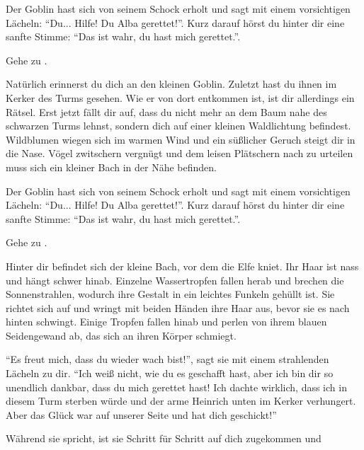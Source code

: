 Der Goblin hast sich von seinem Schock erholt und sagt mit einem vorsichtigen Lächeln: ``Du... Hilfe! Du Alba gerettet!''. Kurz darauf hörst du hinter dir eine sanfte Stimme: ``Das ist wahr, du hast mich gerettet.''.

Gehe zu .


Natürlich erinnerst du dich an den kleinen Goblin.
Zuletzt hast du ihnen im Kerker des Turms gesehen.
Wie er von dort entkommen ist, ist dir allerdings ein Rätsel.
Erst jetzt fällt dir auf, dass du nicht mehr an dem Baum nahe des schwarzen Turms lehnst, sondern dich auf einer kleinen Waldlichtung befindest.
Wildblumen wiegen sich im warmen Wind und ein süßlicher Geruch steigt dir in die Nase. Vögel zwitschern vergnügt und dem leisen Plätschern nach zu urteilen muss sich ein kleiner Bach in der Nähe befinden.

Der Goblin hast sich von seinem Schock erholt und sagt mit einem vorsichtigen Lächeln: ``Du... Hilfe! Du Alba gerettet!''. Kurz darauf hörst du hinter dir eine sanfte Stimme: ``Das ist wahr, du hast mich gerettet.''.

Gehe zu .


Hinter dir befindet sich der kleine Bach, vor dem die Elfe kniet. Ihr Haar ist nass und hängt schwer hinab. Einzelne Wassertropfen fallen herab und brechen die Sonnenstrahlen, wodurch ihre Gestalt in ein leichtes Funkeln gehüllt ist. Sie richtet sich auf und wringt mit beiden Händen ihre Haar aus, bevor sie es nach hinten schwingt. Einige Tropfen fallen hinab und perlen von ihrem blauen Seidengewand ab, das sich an ihren Körper schmiegt.

``Es freut mich, dass du wieder wach bist!'', sagt sie mit einem strahlenden Lächeln zu dir.
``Ich weiß nicht, wie du es geschafft hast, aber ich bin dir so unendlich dankbar, dass du mich gerettet hast! Ich dachte wirklich, dass ich in diesem Turm sterben würde und der arme Heinrich unten im Kerker verhungert. Aber das Glück war auf unserer Seite und hat dich geschickt!''

Während sie spricht, ist sie Schritt für Schritt auf dich zugekommen und
